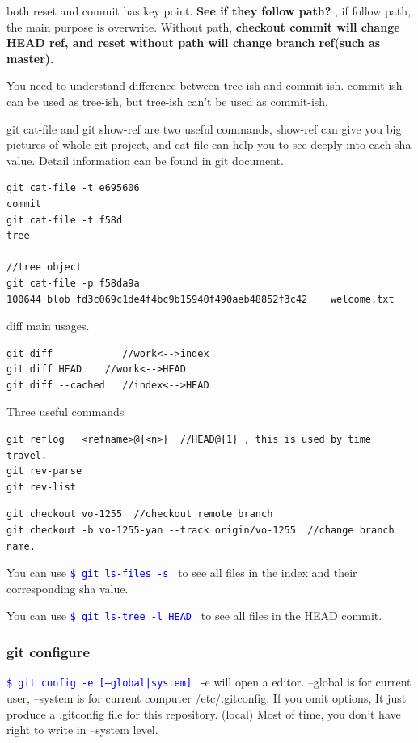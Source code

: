 \documentclass[paper=8.5in:11in, twoside, 12pt, pagesize=pdftex]{book}
\newcommand{\linuxcommand}[1]{\texttt{\textcolor{blue}{\$ #1 \Pisymbol{psy}{191}}}}
\begin{document}
	both reset and commit has key point. \textbf{See if they follow path?} , if follow path, the main purpose is overwrite. 
	Without path,  \textbf{ checkout commit will change HEAD ref, and reset without path will change branch ref(such as master). }
	
	You need to understand difference between tree-ish and commit-ish. commit-ish can be used as tree-ish, but tree-ish can't be used as commit-ish. 
	
	git cat-file and git show-ref are two useful commands, show-ref can give you big pictures of whole git project, and cat-file can help you to see deeply into each sha value. Detail information can be found in git document.     
\begin{lstlisting}
git cat-file -t e695606
commit
git cat-file -t f58d
tree

//tree object
git cat-file -p f58da9a
100644 blob fd3c069c1de4f4bc9b15940f490aeb48852f3c42    welcome.txt
\end{lstlisting}

	diff main usages.
\begin{lstlisting}
git diff            //work<-->index
git diff HEAD    //work<-->HEAD
git diff --cached   //index<-->HEAD
\end{lstlisting}

Three useful commands
\begin{lstlisting}
git reflog   <refname>@{<n>}  //HEAD@{1} , this is used by time travel. 
git rev-parse
git rev-list
\end{lstlisting}


\begin{lstlisting}
git checkout vo-1255  //checkout remote branch
git checkout -b vo-1255-yan --track origin/vo-1255  //change branch name. 
\end{lstlisting}
		
	You can use \linuxcommand{git ls-files -s} to see all files in the index and their corresponding sha value.
	
	You can use \linuxcommand{git ls-tree -l HEAD} to see all files in the HEAD commit.
	

\subsubsection{git configure}

	\linuxcommand{git config -e [--global|system]}  -e will open a editor. --global is for current user, --system is for current computer /etc/.gitconfig.   If you omit options, It just produce a .gitconfig file for this repository. (local) Most of time, you don't have right to write in --system level. 
	
\end{document}

